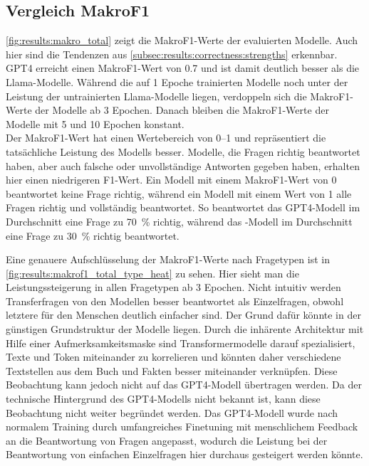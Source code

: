 \subsection{Vergleich MakroF1}

\cref{fig:results:makro_total} zeigt die MakroF1-Werte der evaluierten Modelle.
Auch hier sind die Tendenzen aus \cref{subsec:results:correctness:strengths} erkennbar.
GPT4 erreicht einen MakroF1-Wert von \num{0.7} und ist damit deutlich besser als die Llama-Modelle.
Während die auf 1 Epoche trainierten Modelle noch unter der Leistung der untrainierten Llama-Modelle liegen, verdoppeln sich die MakroF1-Werte der Modelle ab 3 Epochen.
Danach bleiben die MakroF1-Werte der Modelle mit 5 und 10 Epochen konstant.\\

Der MakroF1-Wert hat einen Wertebereich von \numrange{0}{1} und repräsentiert die tatsächliche Leistung des Modells besser.
Modelle, die Fragen richtig beantwortet haben, aber auch falsche oder unvollständige Antworten gegeben haben, erhalten hier einen niedrigeren F1-Wert.
Ein Modell mit einem MakroF1-Wert von \num{0} beantwortet keine Frage richtig, während ein Modell mit einem Wert von \num{1} alle Fragen richtig und vollständig beantwortet.
So beantwortet das GPT4-Modell im Durchschnitt eine Frage zu \SI{70}{\percent} richtig, während das \lea-Modell im Durchschnitt eine Frage zu \SI{30}{\percent} richtig beantwortet.\\


Eine genauere Aufschlüsselung der MakroF1-Werte nach Fragetypen ist in \cref{fig:results:makrof1_total_type_heat} zu sehen.
Hier sieht man die Leistungssteigerung in allen Fragetypen ab 3 Epochen.
Nicht intuitiv werden Transferfragen von den Modellen besser beantwortet als Einzelfragen, obwohl letztere für den Menschen deutlich einfacher sind.
Der Grund dafür könnte in der günstigen Grundstruktur der Modelle liegen.
Durch die inhärente Architektur mit Hilfe einer Aufmerksamkeitsmaske sind Transformermodelle darauf spezialisiert, Texte und Token miteinander zu korrelieren und könnten daher verschiedene Textstellen aus dem Buch und Fakten besser miteinander verknüpfen.
Diese Beobachtung kann jedoch nicht auf das GPT4-Modell übertragen werden.
Da der technische Hintergrund des GPT4-Modells nicht bekannt ist, kann diese Beobachtung nicht weiter begründet werden.
Das GPT4-Modell wurde nach normalem Training durch umfangreiches Finetuning mit menschlichem Feedback an die Beantwortung von Fragen angepasst, wodurch die Leistung bei der Beantwortung von einfachen Einzelfragen hier durchaus gesteigert werden könnte.\\

